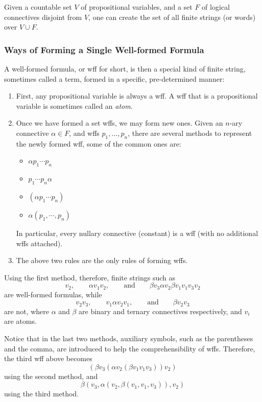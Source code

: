 \documentclass[12pt]{article}
\begin{document}
Given a countable set $V$ of propositional variables, and a set $F$ of logical connectives disjoint from $V$, one can create the set of all finite strings (or words) over $V\cup F$.  

\subsubsection*{Ways of Forming a Single Well-formed Formula}

A well-formed formula, or wff for short, is then a special kind of finite string, sometimes called a term, formed in a specific, pre-determined manner:  
\begin{enumerate}
\item
First, any propositional variable is always a wff.  A wff that is a propositional variable is sometimes called an \emph{atom}.  
\item
Once we have formed a set wffs, we may form new ones.  Given an $n$-ary connective $\alpha\in F$, and wffs $p_1, \ldots, p_n$, there are several methods to represent the newly formed wff, some of the common ones are:
\begin{itemize}
\item $\alpha p_1\cdots p_n$
\item $p_1\cdots p_n \alpha$
\item $(\alpha p_1 \cdots p_n)$
\item $\alpha(p_1, \cdots, p_n)$
\end{itemize}
In particular, every nullary connective (constant) is a wff (with no additional wffs attached).
\item
The above two rules are the only rules of forming wffs.
\end{enumerate}

Using the first method, therefore, finite strings such as 
$$v_2, \qquad \alpha v_1v_2, \qquad \mbox{and} \qquad \beta v_3 \alpha v_2 \beta v_1v_1v_3v_2$$ 
are well-formed formulas, while 
$$v_2v_3, \qquad v_1\alpha v_2v_1, \qquad \mbox{and} \qquad \beta v_2v_3$$ 
are not, where $\alpha$ and $\beta$ are binary and ternary connectives respectively, and $v_i$ are atoms.

Notice that in the last two methods, auxiliary symbols, such as the parentheses and the comma, are introduced to help the comprehensibility of wffs.  Therefore, the third wff above becomes $$(\beta v_3 (\alpha v_2 (\beta v_1v_1v_3))v_2)$$ using the second method, and $$\beta (v_3, \alpha( v_2, \beta( v_1,v_1,v_3)),v_2)$$ using the third method.
\end{document}

